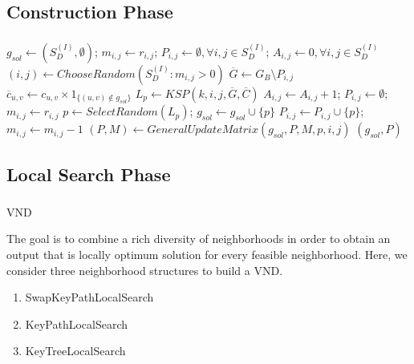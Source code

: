 \subsection{Construction Phase}
\begin{frame}\frametitle{}
    \begin{block}{}
\begin{algorithm}[H]
\caption{$(sol,P) = Construction(G_B,C,R,k)$}
\begin{algorithmic}[1]
\begin{scriptsize}
\STATE $g_{sol} \leftarrow (S_D^{(I)},\emptyset)$; $m_{i,j}\leftarrow r_{i,j}$; $P_{i,j}\leftarrow \emptyset, \forall i,j \in S_{D}^{(I)}$; $A_{i,j}\leftarrow 0, \forall i,j \in S_{D}^{(I)}$
\STATE $(i,j) \leftarrow ChooseRandom(S_{D}^{(I)}: m_{i,j}>0)$
\STATE $\overline{G} \leftarrow G_B \setminus P_{i,j}$
\STATE $\overline{c}_{u,v} \leftarrow c_{u,v} \times 1_{\{(u,v) \notin g_{sol}\}}$
\ENDFOR
\STATE $L_p \leftarrow KSP(k,i,j,\overline{G},\overline{C})$
\STATE $A_{i,j} \leftarrow A_{i,j}+1$; $P_{i,j} \leftarrow \emptyset$; $m_{i,j}\leftarrow r_{i,j}$ 
\ELSE 
\STATE $p \leftarrow SelectRandom(L_p)$; $g_{sol} \leftarrow g_{sol} \cup \{p\}$
\STATE $P_{i,j} \leftarrow P_{i,j} \cup \{p\}$; $m_{i,j} \leftarrow m_{i,j}-1$
\STATE $(P,M) \leftarrow GeneralUpdateMatrix(g_{sol},P,M,p,i,j)$
\ENDIF
\ENDWHILE
\RETURN $(g_{sol},P)$
\end{scriptsize}    
\end{algorithmic}
\end{algorithm}
\end{block}
\end{frame}

\subsection{Local Search Phase}
\begin{frame}\frametitle{}
\begin{block}{VND}
\begin{small}
The goal is to combine a rich diversity of neighborhoods in order to obtain an output that is locally optimum solution for every feasible neighborhood. Here, we consider three neighborhood structures to build a VND.
\begin{enumerate}
 \item SwapKeyPathLocalSearch
 \item KeyPathLocalSearch
 \item KeyTreeLocalSearch
\end{enumerate} 
\end{small}
\end{block}
\end{frame}


